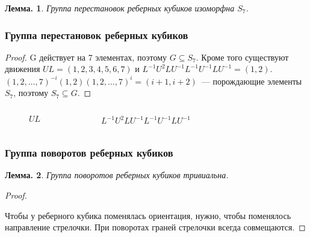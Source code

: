 \documentclass[utf8,russian]{beamer}
\newtheorem{ru_theo}{Лемма.}
\renewenvironment{theorem}{\begin{ru_theo}}{\end{ru_theo}}
\begin{document}
\begin{frame}
\begin{theorem}
	Группа перестановок реберных кубиков изоморфна $S_7$.
\end{theorem}
\frametitle{Группа перестановок реберных кубиков}
\begin{proof}
G действует на 7 элементах, поэтому $G\subseteq S_7$. Кроме того существуют движения $UL=(1,2,3,4,5,6,7)$ и $L^{-1}U^2LU^{-1}L^{-1}U^{-1}LU^{-1}=(1,2)$.
$(1,2,\ldots,7)^{-i}(1,2)(1,2,\ldots,7)^i=(i+1,i+2)$~--- порождающие элементы $S_7$, поэтому $S_7\subseteq G$.
\end{proof}
\vspace*{-5mm}
\begin{columns}[c]
\begin{figure}
\RubikCubeSolved
{}
\caption{$UL$}
\end{figure}
\begin{figure}
\RubikCubeSolved
{}
\caption{$L^{-1}U^2LU^{-1}L^{-1}U^{-1}LU^{-1}$}
\end{figure}
\end{columns}
\end{frame}


\begin{frame}
\frametitle{Группа поворотов реберных кубиков}
\begin{theorem}
Группа поворотов реберных кубиков тривиальна.
\end{theorem}
\begin{proof}
	\RubikCubeSolved
	\begin{figure}
	\end{figure}
	Чтобы у реберного кубика поменялась ориентация, нужно, чтобы поменялось направление стрелочки. При поворотах граней стрелочки всегда совмещаются.
\end{proof}
\end{frame}
\end{document}
